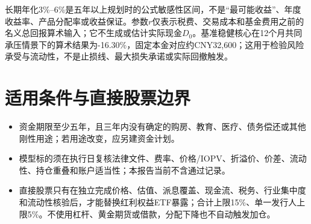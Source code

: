 长期年化3\%--6\%是五年以上规划时的公式敏感性区间，不是“最可能收益”、年度收益率、产品分配率或收益保证。参数$r$仅表示税费、交易成本和基金费用之前的名义总回报算术输入；它不生成或估计实际现金$D_0$。基准稳健核心在12个月共同承压情景下的算术结果为-16.30\%，固定本金对应约CNY32,600；这用于检验风险承受与流动性，不是止损线、最大损失承诺或实际回撤触发。

\section{适用条件与直接股票边界}

{\small
\begin{itemize}
  \item 资金期限至少五年，且三年内没有确定的购房、教育、医疗、债务偿还或其他刚性用途；若用途改变，应另建资金计划。
  \item 模型标的须在执行日复核法律文件、费率、价格/IOPV、折溢价、价差、流动性、持仓重叠和账户适当性；本报告当前不含通过记录。
  \item 直接股票只有在独立完成价格、估值、派息覆盖、现金流、税务、行业集中度和流动性核验后，才能替换红利权益ETF暴露；合计上限15\%、单一发行人上限5\%。不使用杠杆、黄金期货或借款，分配下降也不自动触发加仓。
\end{itemize}
\par}
